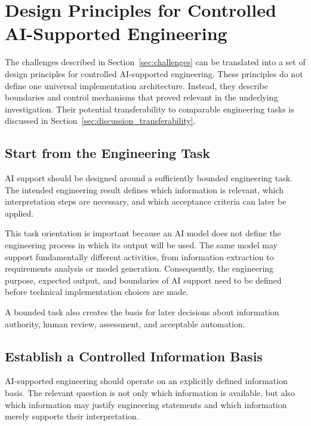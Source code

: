 \section{Design Principles for Controlled AI-Supported Engineering}
\label{sec:design_principles}

The challenges described in Section~\ref{sec:challenges} can be translated into a set of
design principles for controlled AI-supported engineering. These principles do not define
one universal implementation architecture. Instead, they describe boundaries and control
mechanisms that proved relevant in the underlying investigation. Their potential
transferability to comparable engineering tasks is discussed in
Section~\ref{sec:discussion_transferability}.

\subsection{Start from the Engineering Task}
\label{sec:principle_task}

AI support should be designed around a sufficiently bounded engineering task. The intended
engineering result defines which information is relevant, which interpretation steps are
necessary, and which acceptance criteria can later be applied.

This task orientation is important because an AI model does not define the engineering
process in which its output will be used. The same model may support fundamentally different
activities, from information extraction to requirements analysis or model generation.
Consequently, the engineering purpose, expected output, and boundaries of AI support need to
be defined before technical implementation choices are made.

A bounded task also creates the basis for later decisions about information authority,
human review, assessment, and acceptable automation.

\subsection{Establish a Controlled Information Basis}
\label{sec:principle_information_basis}

AI-supported engineering should operate on an explicitly defined information basis. The
relevant question is not only which information is available, but also which information may
justify engineering statements and which information merely supports their interpretation.

